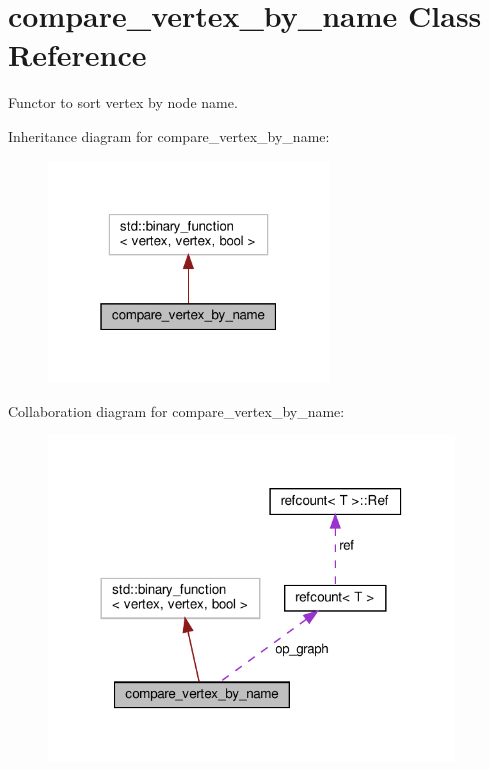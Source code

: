 \hypertarget{classcompare__vertex__by__name}{}\section{compare\+\_\+vertex\+\_\+by\+\_\+name Class Reference}
\label{classcompare__vertex__by__name}


Functor to sort vertex by node name.  




Inheritance diagram for compare\+\_\+vertex\+\_\+by\+\_\+name\+:
\nopagebreak
\begin{figure}[H]
\begin{center}
\leavevmode
\includegraphics[width=211pt]{d1/dfb/classcompare__vertex__by__name__inherit__graph}
\end{center}
\end{figure}


Collaboration diagram for compare\+\_\+vertex\+\_\+by\+\_\+name\+:
\nopagebreak
\begin{figure}[H]
\begin{center}
\leavevmode
\includegraphics[width=305pt]{d2/d13/classcompare__vertex__by__name__coll__graph}
\end{center}
\end{figure}
